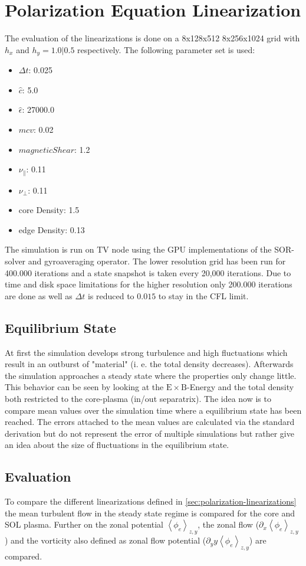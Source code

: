 \documentclass[master.tex]{subfiles}
\newcommand{\meanxy}[1]{\left<#1\right>_{z,y}}
\begin{document}
\chapter{Polarization Equation Linearization}\label{sec:polarization_equation_evaluation}
The evaluation of the linearizations is done on a 8x128x512 8x256x1024 grid with $h_x$ and $h_y=1.0|0.5$ respectively. The following parameter set is used:
\begin{itemize}
    \item $\Delta t$: 0.025
    \item $\hat{c}$: 5.0
    \item $\hat{\epsilon}$: 27000.0
    \item $mcv$: 0.02
    \item $magnetic Shear$: 1.2
    \item $\nu_{\parallel}$: 0.11
    \item $\nu_{\perp}$: 0.11
    \item core Density: 1.5
    \item edge Density: 0.13
\end{itemize}
The simulation is run on \ac{TV} node using the GPU implementations of the \ac{SOR}-solver and gyroaveraging operator. The lower resolution grid has been run for 400.000 iterations and a state snapshot is taken every 20,000 iterations. Due to time and disk space limitations for the higher resolution only 200.000 iterations are done as well as $\Delta t$ is reduced to $0.015$ to stay in the \ac{CFL} limit.

\section{Equilibrium State}
At first the simulation develops strong turbulence and high fluctuations which result in an outburst of "material" (i. e. the total density decreases). Afterwards the simulation approaches a steady state where the properties only change little.  This behavior can be seen by looking at the $\mathrm{E} \times \mathrm{B}$-Energy and the total density both restricted to the core-plasma (in/out separatrix). The idea now is to compare mean values over the simulation time where a equilibrium state has been reached. The errors attached to the mean values are calculated via the standard derivation but do not represent the error of multiple simulations but rather give an idea about the size of fluctuations in the equilibrium state.

\section{Evaluation}
To compare the different linearizations defined in \autoref{sec:polarization-linearizations} the mean turbulent flow in the steady state regime is compared for the core and \ac{SOL} plasma. Further on the zonal potential  $\meanxy{\phi_e}$, the zonal flow ($\partial_x \meanxy{\phi_e}$) and the vorticity also defined as zonal flow potential ($\partial_yy\meanxy{\phi_e}$) are compared.
\end{document}
